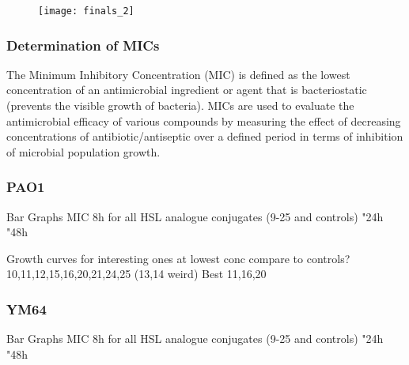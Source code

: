 \begin{figure}[H]
	\begin{center}
		\texttt{[image: finals\_2]}
		\caption{
 		\label{fgr:finals_2}}
	\end{center}
\end{figure}

\subsubsection{Determination of MICs}

The Minimum Inhibitory Concentration (MIC) is defined as the lowest concentration of an antimicrobial ingredient or agent that is bacteriostatic (prevents the visible growth of bacteria). MICs are used to evaluate the antimicrobial efficacy of various compounds by measuring the effect of decreasing concentrations of antibiotic/antiseptic over a defined period in terms of inhibition of microbial population growth.  

\subsubsection{PAO1}

Bar Graphs
MIC 8h for all HSL analogue conjugates (9-25 and controls)
"24h
"48h

Growth curves for interesting ones at lowest conc compare to controls?
10,11,12,15,16,20,21,24,25 (13,14 weird)
Best 11,16,20

\subsubsection{YM64}

Bar Graphs
MIC 8h for all HSL analogue conjugates (9-25 and controls)
"24h
"48h

